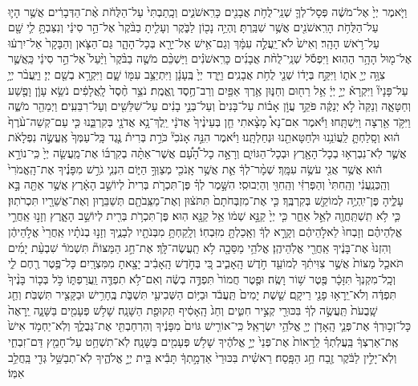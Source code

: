 \documentclass[twoside, openany, parskip=half, 11pt]{book}
\begin{document}
\begin{footnotesize}
\begin{multicols}{2}
\\
וַיֹּ֤אמֶר יְיָ֙ אֶל־מֹשֶׁ֔ה פְּסָל־לְךָ֛ שְׁנֵֽי־לֻחֹ֥ת אֲבָנִ֖ים כָּרִֽאשֹׁנִ֑ים וְכָֽתַבְתִּי֙ עַל־הַלֻּחֹ֔ת אֶ֨ת־הַדְּבָרִ֔ים אֲשֶׁ֥ר הָי֛וּ עַל־הַלֻּחֹ֥ת הָרִֽאשֹׁנִ֖ים אֲשֶׁ֥ר שִׁבַּֽרְתָּ׃ וֶהְיֵ֥ה נָכ֖וֹן לַבֹּ֑קֶר וְעָלִ֤יתָ בַבֹּ֨קֶר֙ אֶל־הַ֣ר סִינַ֔י וְנִצַּבְתָּ֥ לִ֛י שָׁ֖ם עַל־רֹ֥אשׁ הָהָֽר׃ וְאִישׁ֙ לֹא־יַֽעֲלֶ֣ה עִמָּ֔ךְ וְגַם־אִ֥ישׁ אַל־יֵרָ֖א בְּכָל־הָהָ֑ר גַּם־הַצֹּ֤אן וְהַבָּקָר֙ אַל־יִרְע֔וּ אֶל־מ֖וּל הָהָ֥ר הַהֽוּא׃ וַיִּפְסֹ֡ל שְׁנֵֽי־לֻחֹ֨ת אֲבָנִ֜ים כָּרִֽאשֹׁנִ֗ים וַיַּשְׁכֵּ֨ם מֹשֶׁ֤ה בַבֹּ֨קֶר֙ וַיַּ֨עַל֙ אֶל־הַ֣ר סִינַ֔י כַּֽאֲשֶׁ֛ר צִוָּ֥ה יְיָ֖ אֹת֑וֹ וַיִּקַּ֣ח בְּיָד֔וֹ שְׁנֵ֖י לֻחֹ֥ת אֲבָנִֽים׃ וַיֵּ֤רֶד יְיָ֙ בֶּֽעָנָ֔ן וַיִּתְיַצֵּ֥ב עִמּ֖וֹ שָׁ֑ם וַיִּקְרָ֥א בְשֵׁ֖ם יְיָ׃ וַיַּֽעֲבֹ֨ר יְיָ֥ עַל־פָּנָיו֘ וַיִּקְרָא֒ יְיָ֣ יְיָ֔ אֵ֥ל רַח֖וּם וְחַנּ֑וּן אֶ֥רֶךְ אַפַּ֖יִם וְרַב־חֶ֥סֶד וֶֽאֱמֶֽת׃ נֹצֵ֥ר חֶ֨סֶד֙ לָֽאֲלָפִ֔ים נֹשֵׂ֥א עָוֹ֛ן וָפֶ֖שַׁע וְחַטָּאָ֑ה וְנַקֵּה֙ לֹ֣א יְנַקֶּ֔ה פֹּקֵ֣ד עֲוֹ֣ן אָב֗וֹת עַל־בָּנִים֙ וְעַל־בְּנֵ֣י בָנִ֔ים עַל־שִׁלֵּשִׁ֖ים וְעַל־רִבֵּעִֽים׃ וַיְמַהֵ֖ר מֹשֶׁ֑ה וַיִּקֹּ֥ד אַ֖רְצָה וַיִּשְׁתָּֽחוּ׃ וַיֹּ֡אמֶר אִם־נָא֩ מָצָ֨אתִי חֵ֤ן בְּעֵינֶ֨יךָ֙ אֲדֹנָ֔י יֵֽלֶךְ־נָ֥א אֲדֹנָ֖י בְּקִרְבֵּ֑נוּ כִּ֤י עַם־קְשֵׁה־עֹ֨רֶף֙ ה֔וּא וְסָֽלַחְתָּ֛ לַֽעֲוֹנֵ֥נוּ וּלְחַטָּאתֵ֖נוּ וּנְחַלְתָּֽנוּ׃ וַיֹּ֗אמֶר הִנֵּ֣ה אָנֹכִי֘ כֹּרֵ֣ת בְּרִית֒ נֶ֤גֶד כָּֽל־עַמְּךָ֙ אֶֽעֱשֶׂ֣ה נִפְלָאֹ֔ת אֲשֶׁ֛ר לֹֽא־נִבְרְא֥וּ בְכָל־הָאָ֖רֶץ וּבְכָל־הַגּוֹיִ֑ם וְרָאָ֣ה כָל־הָ֠עָ֠ם אֲשֶׁר־אַתָּ֨ה בְקִרְבּ֜וֹ אֶת־מַֽעֲשֵׂ֤ה יְיָ֙ כִּֽי־נוֹרָ֣א ה֔וּא אֲשֶׁ֥ר אֲנִ֖י עֹשֶׂ֥ה עִמָּֽךְ׃ 
שְׁמָ֨ר־לְךָ֔ אֵ֛ת אֲשֶׁ֥ר אָֽנֹכִ֖י מְצַוְּךָ֣ הַיּ֑וֹם הִנְנִ֧י גֹרֵ֣שׁ מִפָּנֶ֗יךָ אֶת־הָֽאֱמֹרִי֙ וְהַֽכְּנַֽעֲנִ֔י וְהַֽחִתִּי֙ וְהַפְּרִזִּ֔י וְהַֽחִוִּ֖י וְהַיְבוּסִֽי׃ הִשָּׁ֣מֶר לְךָ֗ פֶּן־תִּכְרֹ֤ת בְּרִית֙ לְיוֹשֵׁ֣ב הָאָ֔רֶץ אֲשֶׁ֥ר אַתָּ֖ה בָּ֣א עָלֶ֑יהָ פֶּן־יִֽהְיֶ֥ה לְמוֹקֵ֖שׁ בְּקִרְבֶּֽךָ׃ כִּ֤י אֶת־מִזְבְּחֹתָם֙ תִּתֹּצ֔וּן וְאֶת־מַצֵּֽבֹתָ֖ם תְּשַׁבֵּר֑וּן וְאֶת־אֲשֵׁרָ֖יו תִּכְרֹתֽוּן׃ כִּ֛י לֹ֥א תִֽשְׁתַּֽחֲוֶ֖ה לְאֵ֣ל אַחֵ֑ר כִּ֤י יְיָ֙ קַנָּ֣א שְׁמ֔וֹ אֵ֥ל קַנָּ֖א הֽוּא׃ פֶּן־תִּכְרֹ֥ת בְּרִ֖ית לְיוֹשֵׁ֣ב הָאָ֑רֶץ וְזָנ֣וּ אַֽחֲרֵ֣י אֱלֹֽהֵיהֶ֗ם וְזָבְחוּ֙ לֵאלֹ֣הֵיהֶ֔ם וְקָרָ֣א לְךָ֔ וְאָֽכַלְתָּ֖ מִזִּבְחֽוֹ׃ וְלָֽקַחְתָּ֥ מִבְּנֹתָ֖יו לְבָנֶ֑יךָ וְזָנ֣וּ בְנֹתָ֗יו אַֽחֲרֵי֙ אֱלֹ֣הֵיהֶ֔ן וְהִזְנוּ֙ אֶת־בָּנֶ֔יךָ אַֽחֲרֵ֖י אֱלֹֽהֵיהֶֽן׃ אֱלֹהֵ֥י מַסֵּכָ֖ה לֹ֥א תַֽעֲשֶׂה־לָּֽךְ׃  אֶת־חַ֣ג הַמַּצּוֹת֘ תִּשְׁמֹר֒ שִׁבְעַ֨ת יָמִ֜ים תֹּאכַ֤ל מַצּוֹת֙ אֲשֶׁ֣ר צִוִּיתִ֔ךָ לְמוֹעֵ֖ד חֹ֣דֶשׁ הָֽאָבִ֑יב כִּ֚י בְּחֹ֣דֶשׁ הָֽאָבִ֔יב יָצָ֖אתָ מִמִּצְרָֽיִם׃ כָּל־פֶּ֥טֶר רֶ֖חֶם לִ֑י וְכָֽל־מִקְנְךָ֙ תִּזָּכָ֔ר פֶּ֖טֶר שׁ֥וֹר וָשֶֽׂה׃ וּפֶ֤טֶר חֲמוֹר֙ תִּפְדֶּ֣ה בְשֶׂ֔ה וְאִם־לֹ֥א תִפְדֶּ֖ה וַֽעֲרַפְתּ֑וֹ כֹּ֣ל בְּכ֤וֹר בָּנֶ֨יךָ֙ תִּפְדֶּ֔ה וְלֹא־יֵֽרָא֥וּ פָנַ֖י רֵיקָֽם׃ שֵׁ֤שֶׁת יָמִים֙ תַּֽעֲבֹ֔ד וּבַיּ֥וֹם הַשְּׁבִיעִ֖י תִּשְׁבֹּ֑ת בֶּֽחָרִ֥ישׁ וּבַקָּצִ֖יר תִּשְׁבֹּֽת׃ וְחַ֤ג שָֽׁבֻעֹת֙ תַּֽעֲשֶׂ֣ה לְךָ֔ בִּכּוּרֵ֖י קְצִ֣יר חִטִּ֑ים וְחַג֙ הָֽאָסִ֔יף תְּקוּפַ֖ת הַשָּׁנָֽה׃ שָׁל֥שׁ פְּעָמִ֖ים בַּשָּׁנָ֑ה יֵֽרָאֶה֙ כָּל־זְכ֣וּרְךָ֔ אֶת־פְּנֵ֛י הָֽאָדֹ֥ן יְיָ֖ אֱלֹהֵ֥י יִשְׂרָאֵֽל׃ כִּֽי־אוֹרִ֤ישׁ גּוֹיִם֙ מִפָּנֶ֔יךָ וְהִרְחַבְתִּ֖י אֶת־גְּבֻלֶ֑ךָ וְלֹֽא־יַחְמֹ֥ד אִישׁ֙ אֶֽת־אַרְצְךָ֔ בַּֽעֲלֹֽתְךָ֗ לֵֽרָאוֹת֙ אֶת־פְּנֵי֙ יְיָ֣ אֱלֹהֶ֔יךָ שָׁל֥שׁ פְּעָמִ֖ים בַּשָּׁנָֽה׃ לֹֽא־תִשְׁחַ֥ט עַל־חָמֵ֖ץ דַּם־זִבְחִ֑י וְלֹֽא־יָלִ֣ין לַבֹּ֔קֶר זֶ֖בַח חַ֥ג הַפָּֽסַח׃ רֵאשִׁ֗ית בִּכּוּרֵי֙ אַדְמָ֣תְךָ֔ תָּבִ֕יא בֵּ֖ית יְיָ֣ אֱלֹהֶ֑יךָ לֹֽא־תְבַשֵּׁ֥ל גְּדִ֖י בַּֽחֲלֵ֥ב אִמּֽוֹ׃

\end{multicols}
\end{footnotesize}
\end{document}

